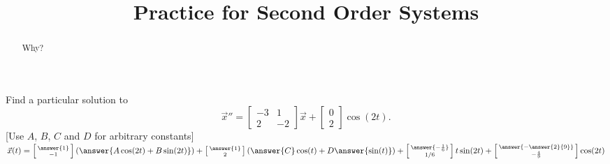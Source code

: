 \documentclass{ximera}
\title{Practice for Second Order Systems}
\begin{document}
\begin{abstract}
Why?
\end{abstract}
\maketitle

\begin{exercise}
    Find a particular solution to
    \begin{equation*}
        {\vec{x}}'' =
        \begin{bmatrix}
            -3 & 1 \\
            2 & -2
        \end{bmatrix}
        \vec{x}  + 
        \begin{bmatrix}
            0 \\ 
            2
        \end{bmatrix}
        \cos (2 t) .
    \end{equation*}
    [Use $A$, $B$, $C$ and $D$ for arbitrary constants]\\
    $\vec{x}(t) = \left[\begin{smallmatrix} \answer{1} \\ -1 \end{smallmatrix}\right]\left(\answer{A\cos(2t) + B\sin(2t)}\right) + \left[\begin{smallmatrix} \answer{1} \\ 2 \end{smallmatrix}\right](\answer{C}\cos(t) + D\answer{\sin(t)}) + \left[\begin{smallmatrix} \answer{-\frac{1}{6}} \\ 1/6 \end{smallmatrix}\right]t\sin(2t) + \left[\begin{smallmatrix} \answer{-\answer{2}{9}} \\ -\frac{4}{9} \end{smallmatrix}\right]\cos(2t)$
\end{exercise}
\end{document}
